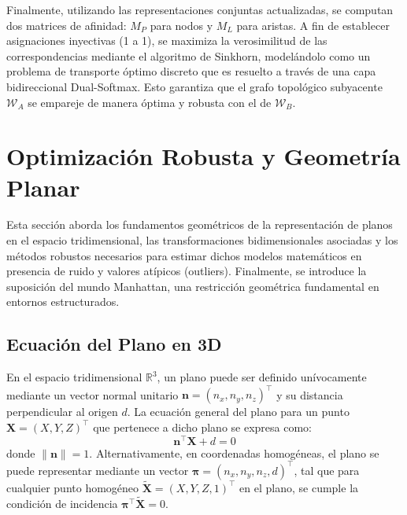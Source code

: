 Finalmente, utilizando las representaciones conjuntas actualizadas, se computan dos matrices de afinidad: $M_P$ para nodos y $M_L$ para aristas. A fin de establecer asignaciones inyectivas (1 a 1), se maximiza la verosimilitud de las correspondencias mediante el algoritmo de Sinkhorn, modelándolo como un problema de transporte óptimo discreto que es resuelto a través de una capa bidireccional Dual-Softmax. Esto garantiza que el grafo topológico subyacente $\mathcal{W}_A$ se empareje de manera óptima y robusta con el de $\mathcal{W}_B$.

\section{Optimización Robusta y Geometría Planar}

Esta sección aborda los fundamentos geométricos de la representación de planos en el espacio tridimensional, las transformaciones bidimensionales asociadas y los métodos robustos necesarios para estimar dichos modelos matemáticos en presencia de ruido y valores atípicos (outliers). Finalmente, se introduce la suposición del mundo Manhattan, una restricción geométrica fundamental en entornos estructurados.

\subsection{Ecuación del Plano en 3D}
En el espacio tridimensional $\mathbb{R}^3$, un plano puede ser definido unívocamente mediante un vector normal unitario $\mathbf{n} = (n_x, n_y, n_z)^\top$ y su distancia perpendicular al origen $d$. La ecuación general del plano para un punto $\mathbf{X} = (X, Y, Z)^\top$ que pertenece a dicho plano se expresa como:
\begin{equation}
    \mathbf{n}^\top \mathbf{X} + d = 0
\end{equation}
donde $\|\mathbf{n}\| = 1$. Alternativamente, en coordenadas homogéneas, el plano se puede representar mediante un vector $\boldsymbol{\pi} = (n_x, n_y, n_z, d)^\top$, tal que para cualquier punto homogéneo $\tilde{\mathbf{X}} = (X, Y, Z, 1)^\top$ en el plano, se cumple la condición de incidencia $\boldsymbol{\pi}^\top \tilde{\mathbf{X}} = 0$.

